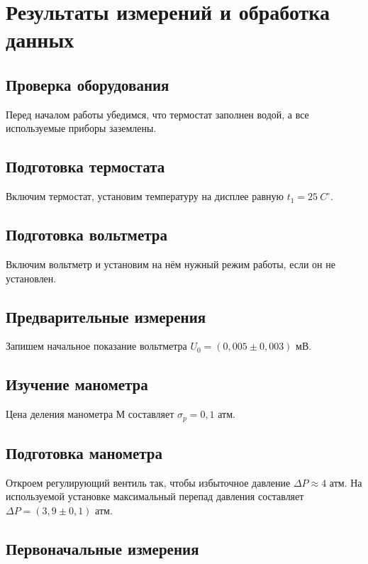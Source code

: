 \documentclass[a4paper,12pt]{article}
\begin{document}
\section{Результаты измерений и обработка данных}

\subsection{Проверка оборудования}

Перед началом работы убедимся, что термостат заполнен водой, а все используемые приборы заземлены.

\subsection{Подготовка термостата}

Включим термостат, установим температуру на дисплее равную $t_1 = 25 \ C^\circ$.

\subsection{Подготовка вольтметра}

Включим вольтметр и установим на нём нужный режим работы, если он не установлен.

\subsection{Предварительные измерения}

Запишем начальное показание вольтметра $U_0 = (0,005 \pm 0,003)$ мВ.

\subsection{Изучение манометра}

Цена деления манометра М составляет $\sigma_p = 0,1$ атм.

\subsection{Подготовка манометра}

Откроем регулирующий вентиль так, чтобы избыточное давление $\Delta P \approx 4$ атм. На используемой установке максимальный перепад давления составляет $\Delta P = (3,9 \pm 0,1)$ атм.

\subsection{Первоначальные измерения}
\end{document}
